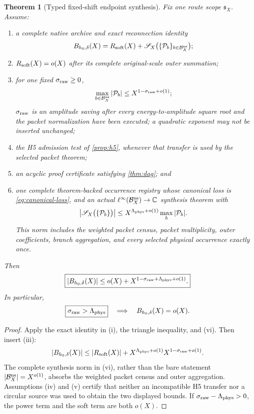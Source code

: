 \documentclass[11pt]{article}
\newtheorem{theorem}{Theorem}[section]
\theoremstyle{definition}
\theoremstyle{remark}
\newcommand{\cB}{\mathcal B}
\begin{document}
\begin{theorem}[Typed fixed-shift endpoint synthesis]
\label{thm:synthesis}
Fix one route scope \(\mathfrak s_X\).  Assume:
\begin{enumerate}[label=(\roman*),leftmargin=2.2em]
\item a complete native archive and exact reconnection identity
\[
 B_{h_0,\delta}(X)
 =
 R_{\rm soft}(X)
 +
 \mathscr S_X\bigl(\{\mathcal P_b\}_{b\in\cB_X^{\rm ns}}\bigr);
\]
\item \(R_{\rm soft}(X)=o(X)\) after its complete original-scale
outer summation;
\item for one fixed \(\sigma_{\rm raw}\ge0\),
\[
 \max_{b\in\cB_X^{\rm ns}}|\mathcal P_b|
 \le X^{1-\sigma_{\rm raw}+o(1)};
\]
\(\sigma_{\rm raw}\) is an \emph{amplitude} saving after every
energy-to-amplitude square root and the packet normalization have
been executed; a quadratic exponent may not be inserted unchanged;
\item the H5 admission test of \cref{prop:h5}, whenever that transfer
is used by the selected packet theorem;
\item an acyclic proof certificate satisfying
\cref{thm:dag}; and
\item one complete theorem-backed occurrence registry whose
canonical loss is \eqref{eq:canonical-loss}, and an actual
\(\ell^\infty(\cB_X^{\rm ns})\to\mathbb C\) synthesis theorem with
\[
 \left|
 \mathscr S_X\bigl(\{\mathcal P_b\}\bigr)
 \right|
 \le
 X^{\Lambda_{\rm phys}+o(1)}
 \max_b|\mathcal P_b|.
 \]
This norm includes the weighted packet census, packet multiplicity,
outer coefficients, branch aggregation, and every selected physical
occurrence exactly once.
\end{enumerate}
Then
\[
 \boxed{
 |B_{h_0,\delta}(X)|
 \le
 o(X)+
 X^{1-\sigma_{\rm raw}+\Lambda_{\rm phys}+o(1)}.}
\]
In particular,
\[
 \boxed{\sigma_{\rm raw}>\Lambda_{\rm phys}}
\quad\Longrightarrow\quad
B_{h_0,\delta}(X)=o(X).
\]
\end{theorem}

\begin{proof}
Apply the exact identity in (i), the triangle inequality, and (vi).
Then insert (iii):
\[
 |B_{h_0,\delta}(X)|
 \le |R_{\rm soft}(X)|
 +X^{\Lambda_{\rm phys}+o(1)}
  X^{1-\sigma_{\rm raw}+o(1)}.
\]
The complete synthesis norm in (vi), rather than the bare statement
\(|\cB_X^{\rm ns}|=X^{o(1)}\), absorbs the weighted packet census and
outer aggregation.  Assumptions (iv) and (v) certify
that neither an incompatible H5 transfer nor a circular source was
used to obtain the two displayed bounds.  If
\(\sigma_{\rm raw}-\Lambda_{\rm phys}>0\), the power term and the soft
term are both \(o(X)\).
\end{proof}
\end{document}
